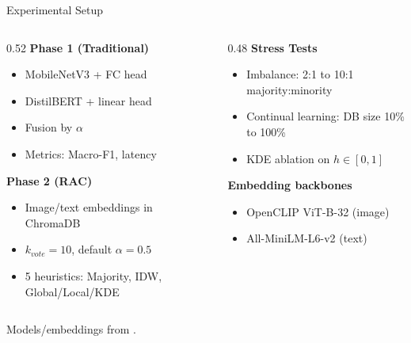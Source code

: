 \documentclass[aspectratio=169]{beamer}
\begin{document}
\begin{frame}{Experimental Setup}
\small
\begin{columns}[T]
  \begin{column}{0.52\textwidth}
    \textbf{Phase 1 (Traditional)}
    \begin{itemize}
      \item MobileNetV3 + FC head
      \item DistilBERT + linear head
      \item Fusion by $\alpha$
      \item Metrics: Macro-F1, latency
    \end{itemize}

    \textbf{Phase 2 (RAC)}
    \begin{itemize}
      \item Image/text embeddings in ChromaDB
      \item $k_{vote}=10$, default $\alpha=0.5$
      \item 5 heuristics: Majority, IDW, Global/Local/KDE
    \end{itemize}
  \end{column}
  \begin{column}{0.48\textwidth}
    \textbf{Stress Tests}
    \begin{itemize}
      \item Imbalance: 2:1 to 10:1 majority:minority
      \item Continual learning: DB size 10\% to 100\%
      \item KDE ablation on $h \in [0,1]$
    \end{itemize}

    \vspace{4pt}
    \textbf{Embedding backbones}
    \begin{itemize}
      \item OpenCLIP ViT-B-32 (image)
      \item All-MiniLM-L6-v2 (text)
    \end{itemize}
  \end{column}
\end{columns}
\vspace{2pt}
{\tiny Models/embeddings from \cite{howard2019searching,sanh2019distilbert,cazarin2025multimodal,abimbola2026open}.}
\end{frame}
\end{document}
